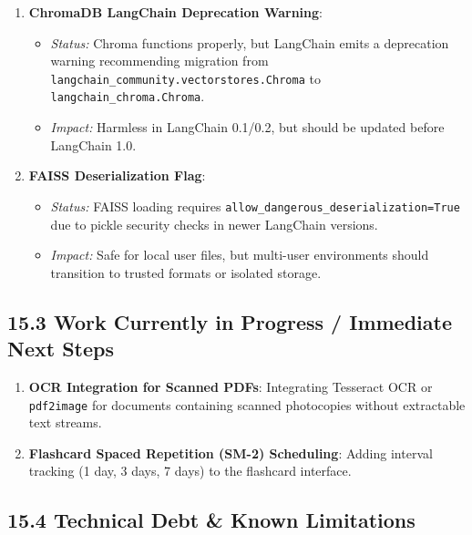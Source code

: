 \documentclass[
]{article}
\providecommand{\tightlist}{%
  \setlength{\itemsep}{0pt}\setlength{\parskip}{0pt}}
\begin{document}
\begin{enumerate}
\def\labelenumi{\arabic{enumi}.}
\tightlist
\item
  \textbf{ChromaDB LangChain Deprecation Warning}:

  \begin{itemize}
  \tightlist
  \item
    \emph{Status:} Chroma functions properly, but LangChain emits a
    deprecation warning recommending migration from
    \texttt{langchain\_\allowbreak community.\allowbreak vectorstores.\allowbreak Chroma} to
    \texttt{langchain\_\allowbreak chroma.\allowbreak Chroma}.
  \item
    \emph{Impact:} Harmless in LangChain 0.1/0.2, but should be updated
    before LangChain 1.0.
  \end{itemize}
\item
  \textbf{FAISS Deserialization Flag}:

  \begin{itemize}
  \tightlist
  \item
    \emph{Status:} FAISS loading requires
    \texttt{allow\_\allowbreak dangerous\_\allowbreak deserialization=\allowbreak True} due to pickle
    security checks in newer LangChain versions.
  \item
    \emph{Impact:} Safe for local user files, but multi-user
    environments should transition to trusted formats or isolated
    storage.
  \end{itemize}
\end{enumerate}

\subsection{15.3 Work Currently in Progress / Immediate Next
Steps}\label{work-currently-in-progress-immediate-next-steps}

\begin{enumerate}
\def\labelenumi{\arabic{enumi}.}
\tightlist
\item
  \textbf{OCR Integration for Scanned PDFs}: Integrating Tesseract OCR
  or \texttt{pdf2image} for documents containing scanned photocopies
  without extractable text streams.
\item
  \textbf{Flashcard Spaced Repetition (SM-2) Scheduling}: Adding
  interval tracking (1 day, 3 days, 7 days) to the flashcard interface.
\end{enumerate}

\subsection{15.4 Technical Debt \& Known
Limitations}\label{technical-debt-known-limitations}
\end{document}
